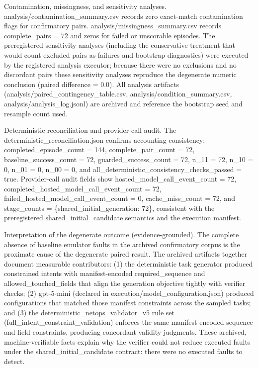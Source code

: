 \documentclass[conference]{IEEEtran}
\begin{document}
Contamination, missingness, and sensitivity analyses. analysis/contamination\_summary.csv records zero exact-match contamination flags for confirmatory pairs. analysis/missingness\_summary.csv records complete\_pairs = 72 and zeros for failed or unscorable episodes. The preregistered sensitivity analyses (including the conservative treatment that would count excluded pairs as failures and bootstrap diagnostics) were executed by the registered analysis executor; because there were no exclusions and no discordant pairs these sensitivity analyses reproduce the degenerate numeric conclusion (paired difference = 0.0). All analysis artifacts (analysis/paired\_contingency\_table.csv, analysis/condition\_summary.csv, analysis/analysis\_log.jsonl) are archived and reference the bootstrap seed and resample count used.

Deterministic reconciliation and provider-call audit. The deterministic\_reconciliation.json confirms accounting consistency: completed\_episode\_count = 144, complete\_pair\_count = 72, baseline\_success\_count = 72, guarded\_success\_count = 72, n\_11 = 72, n\_10 = 0, n\_01 = 0, n\_00 = 0, and all\_deterministic\_consistency\_checks\_passed = true. Provider-call audit fields show hosted\_model\_call\_event\_count = 72, completed\_hosted\_model\_call\_event\_count = 72, failed\_hosted\_model\_call\_event\_count = 0, cache\_miss\_count = 72, and stage\_counts = \{shared\_initial\_generation: 72\}, consistent with the preregistered shared\_initial\_candidate semantics and the execution manifest.

Interpretation of the degenerate outcome (evidence-grounded). The complete absence of baseline emulator faults in the archived confirmatory corpus is the proximate cause of the degenerate paired result. The archived artifacts together document measurable contributors: (1) the deterministic task generator produced constrained intents with manifest-encoded required\_sequence and allowed\_touched\_fields that align the generation objective tightly with verifier checks; (2) gpt-5-mini (declared in execution/model\_configuration.json) produced configurations that matched those manifest constraints across the sampled tasks; and (3) the deterministic\_netops\_validator\_v5 rule set (full\_intent\_constraint\_validation) enforces the same manifest-encoded sequence and field constraints, producing concordant validity judgments. These archived, machine-verifiable facts explain why the verifier could not reduce executed faults under the shared\_initial\_candidate contract: there were no executed faults to detect.
\end{document}
